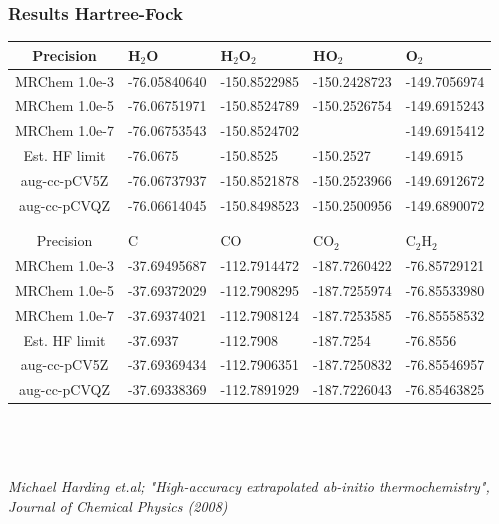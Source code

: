\documentclass[mathserif]{beamer}
\begin{document}
\begin{frame}
    \frametitle{Results Hartree-Fock}
\begin{table}
\tiny
\begin{tabular}{|c|l|l|l|l|}
\hline Precision     &       H$_2$O &    H$_2$O$_2$ &        HO$_2$ &       O$_2$  \\
\hline MRChem 1.0e-3 & -76.05840640 &  -150.8522985 &  -150.2428723 & -149.7056974 \\
       MRChem 1.0e-5 & -76.06751971 &  -150.8524789 &  -150.2526754 & -149.6915243 \\
       MRChem 1.0e-7 & -76.06753543 &  -150.8524702 &               & -149.6915412 \\
\hline Est. HF limit & -76.0675     &  -150.8525    &  -150.2527    & -149.6915    \\
\hline aug-cc-pCV5Z  & -76.06737937 &  -150.8521878 &  -150.2523966 & -149.6912672 \\
       aug-cc-pCVQZ  & -76.06614045 &  -150.8498523 &  -150.2500956 & -149.6890072 \\
\hline \multicolumn{5}{c}{} \\
       \multicolumn{5}{c}{} \\
\hline Precision     &            C &            CO &        CO$_2$ &   C$_2$H$_2$ \\
\hline MRChem 1.0e-3 & -37.69495687 &  -112.7914472 &  -187.7260422 & -76.85729121 \\
       MRChem 1.0e-5 & -37.69372029 &  -112.7908295 &  -187.7255974 & -76.85533980 \\
       MRChem 1.0e-7 & -37.69374021 &  -112.7908124 &  -187.7253585 & -76.85558532 \\
\hline Est. HF limit & -37.6937     &  -112.7908    &  -187.7254    & -76.8556     \\
\hline aug-cc-pCV5Z  & -37.69369434 &  -112.7906351 &  -187.7250832 & -76.85546957 \\
       aug-cc-pCVQZ  & -37.69338369 &  -112.7891929 &  -187.7226043 & -76.85463825 \\
\hline   \end{tabular} 
\end{table}
    \ \\
    \ \\
    \ \\
    \tiny \it{Michael Harding et.al; "High-accuracy extrapolated ab-initio 
	    thermochemistry", Journal of Chemical Physics (2008)}

\end{frame}
\end{document}
